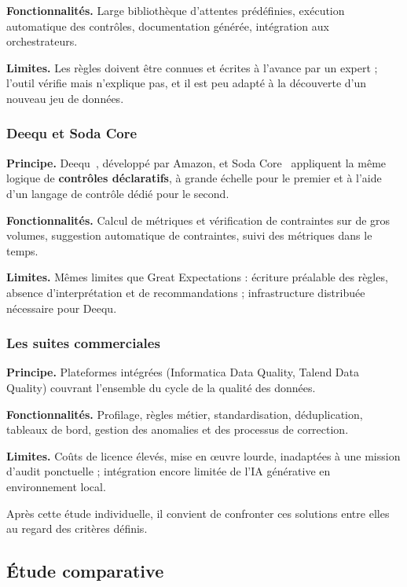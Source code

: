 \textbf{Fonctionnalités.} Large bibliothèque d'attentes prédéfinies, exécution automatique des contrôles, documentation générée, intégration aux orchestrateurs.

\textbf{Limites.} Les règles doivent être connues et écrites à l'avance par un expert ; l'outil vérifie mais n'explique pas, et il est peu adapté à la découverte d'un nouveau jeu de données.

\subsubsection{Deequ et Soda Core}

\textbf{Principe.} Deequ~\cite{deequ}, développé par Amazon, et Soda Core~\cite{soda} appliquent la même logique de \textbf{contrôles déclaratifs}, à grande échelle pour le premier et à l'aide d'un langage de contrôle dédié pour le second.

\textbf{Fonctionnalités.} Calcul de métriques et vérification de contraintes sur de gros volumes, suggestion automatique de contraintes, suivi des métriques dans le temps.

\textbf{Limites.} Mêmes limites que Great Expectations : écriture préalable des règles, absence d'interprétation et de recommandations ; infrastructure distribuée nécessaire pour Deequ.

\subsubsection{Les suites commerciales}

\textbf{Principe.} Plateformes intégrées (Informatica Data Quality, Talend Data Quality) couvrant l'ensemble du cycle de la qualité des données.

\textbf{Fonctionnalités.} Profilage, règles métier, standardisation, déduplication, tableaux de bord, gestion des anomalies et des processus de correction.

\textbf{Limites.} Coûts de licence élevés, mise en œuvre lourde, inadaptées à une mission d'audit ponctuelle ; intégration encore limitée de l'IA générative en environnement local.

Après cette étude individuelle, il convient de confronter ces solutions entre elles au regard des critères définis.

\subsection{Étude comparative}

